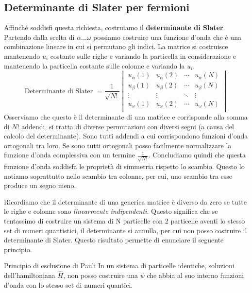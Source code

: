 \subsection*{Determinante di Slater per fermioni}
\noindent Affinché soddisfi questa richiesta, costruiamo il \textbf{determinante di Slater}. Partendo dalla scelta di $\alpha \dots \omega$ possiamo costruire una funzione d'onda che è una combinazione lineare in cui si permutano gli indici. La matrice si costruisce mantenendo $u_i$ costante sulle righe e variando la particella in considerazione e mantenendo la particella costante sulle colonne e variando la $u_i$.
\begin{equation*}
    \text{Determinante di Slater }=
    \frac{1}{\sqrt{N!}}
    \begin{vmatrix}
        u_\alpha(1) & u_\alpha(2) & \cdots & u_\alpha(N) \\
        u_\beta(1) & u_\beta(2) & \cdots & u_\beta(N) \\
        \vdots & \vdots & \ddots & \vdots \\
        u_\omega(1) & u_\omega(2) & \cdots & u_\omega(N) \\
    \end{vmatrix}
\end{equation*}
Osserviamo che questo è il determinante di una matrice e corrisponde alla somma di $N!$ addendi, si tratta di diverse permutazioni con diversi segni (a causa del calcolo del determinante). Sono tutti addendi a cui corrispondono funzioni d'onda ortogonali tra loro. Se sono tutti ortogonali posso facilmente normalizzare la funzione d'onda complessiva con un termine $\frac{1}{\sqrt{N!}}$. Concludiamo quindi che questa funzione d'onda soddisfa le proprietà di simmetria rispetto lo scambio. Questo lo notiamo soprattutto nello scambio tra colonne, per cui, uno scambio tra esse produce un segno meno.

Ricordiamo che il determinante di una generica matrice è diverso da zero se tutte le righe e colonne sono \textit{linearmente indipendenti}. Questo significa che se tentassimo di costruire un sistema di N particelle con 2 particelle aventi lo stesso set di numeri quantistici, il determinante si annulla, per cui non posso costruire il determinante di Slater. Questo risultato permette di enunciare il seguente principio.

\begin{definition}{Principio di esclusione di Pauli}
    In un sistema di particelle identiche, soluzioni dell'hamiltoniana $\hat H$, non posso costruire una $\psi$ che abbia al suo interno funzioni d'onda con lo stesso set di numeri quantici.
\end{definition}

